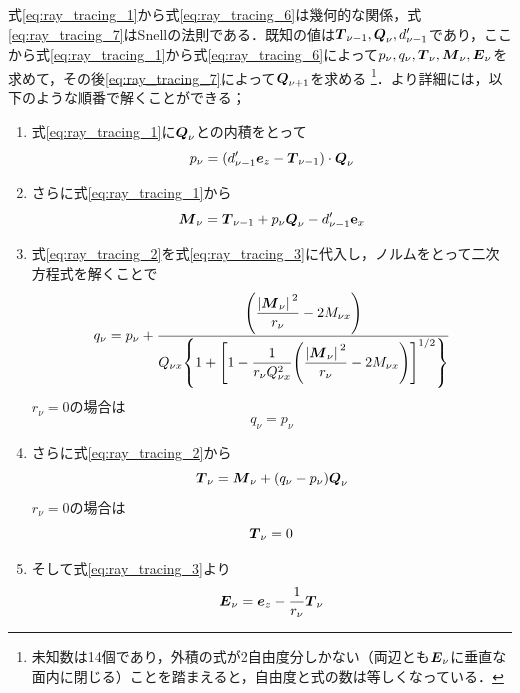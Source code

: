 \documentclass{jsarticle}
\begin{document}
式\eqref{eq:ray_tracing_1}から式\eqref{eq:ray_tracing_6}は幾何的な関係，式\eqref{eq:ray_tracing_7}はSnellの法則である．既知の値は$\vb*{T}_{\nu-1},\vb*{Q}_\nu, d_{\nu-1}'$であり，ここから式\eqref{eq:ray_tracing_1}から式\eqref{eq:ray_tracing_6}によって$p_\nu, q_\nu, \vb*{T}_\nu,\vb*{M}_\nu,\vb*{E}_\nu$を求めて，その後\eqref{eq:ray_tracing_7}によって$\vb*{Q}_{\nu+1}$を求める
\footnote{
    未知数は14個であり，外積の式が2自由度分しかない（両辺とも$\vb*{E}_\nu$に垂直な面内に閉じる）ことを踏まえると，自由度と式の数は等しくなっている．
}．より詳細には，以下のような順番で解くことができる；
\begin{enumerate}
    \item 式\eqref{eq:ray_tracing_1}に$\vb*{Q}_\nu$との内積をとって
        \begin{equation}
            p_\nu=(d_{\nu-1}'\vb*{e}_z-\vb*{T}_{\nu-1})\cdot\vb*{Q}_\nu
        \end{equation}
    \item さらに式\eqref{eq:ray_tracing_1}から
        \begin{equation}
            \vb*{M}_\nu=\vb*{T}_{\nu-1}+p_\nu\vb*{Q}_\nu-d_{\nu-1}'\vb{e}_x
        \end{equation}
    \item 式\eqref{eq:ray_tracing_2}を式\eqref{eq:ray_tracing_3}に代入し，ノルムをとって二次方程式を解くことで
        \begin{equation}
            q_\nu=p_\nu+\frac{\qty(\dfrac{\abs*{\vb*{M}_\nu}^2}{r_\nu}-2M_{\nu x})}{Q_{\nu x}\qty{1+\qty[1-\dfrac{1}{r_\nu Q_{\nu x}^2}\qty(\dfrac{\abs*{\vb*{M}_\nu}^2}{r_\nu}-2M_{\nu x})]^{1/2}}}
        \end{equation}
    $r_\nu=0$の場合は
        \begin{equation}
            q_\nu=p_\nu
        \end{equation}
    \item さらに式\eqref{eq:ray_tracing_2}から
        \begin{equation}
            \vb*{T}_\nu=\vb*{M}_\nu+(q_\nu-p_\nu)\vb*{Q}_\nu
        \end{equation}
    $r_\nu=0$の場合は
        \begin{equation}
            \vb*{T}_\nu=0
        \end{equation}
    \item そして式\eqref{eq:ray_tracing_3}より
        \begin{equation}
            \vb*{E}_\nu=\vb*{e}_z-\frac{1}{r_\nu}\vb*T_{\nu}
        \end{equation}

\end{enumerate}
\end{document}
